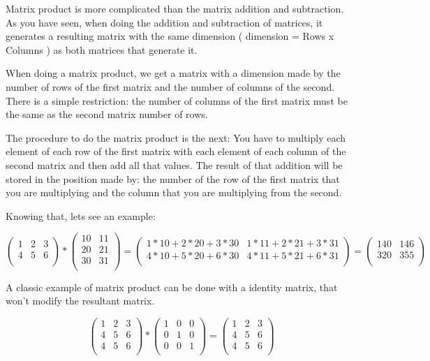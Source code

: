 \documentclass{article}
\begin{document}
Matrix product is more complicated than the matrix addition and subtraction. As you have
seen, when doing the addition and subtraction of matrices, it generates a resulting matrix
with the same dimension ( dimension = Rows x Columns ) as both matrices that generate it.

When doing a matrix product, we get a matrix with a dimension made by the number of rows of
the first matrix and the number of columns of the second. There is a simple restriction: 
the number of columns of the first matrix must be the same as the second matrix number of rows.

The procedure to do the matrix product is the next: You have to multiply each element of 
each row of the first matrix with each element of each column of the second matrix and then
add all that values. The result of that addition will be stored in the position made by: 
the number of the row of the first matrix that you are multiplying and the column that you
are multiplying from the second.

Knowing that, lets see an example:

\[
\begin{pmatrix}
    1 & 2 & 3 \\
    4 & 5 & 6 \\
\end{pmatrix}
  * 
\begin{pmatrix}
    10 & 11 \\
    20 & 21 \\
    30 & 31 \\
\end{pmatrix}
=
\begin{pmatrix}
    1*10+2*20+3*30 & 1*11+2*21+3*31 \\
    4*10+5*20+6*30 & 4*11+5*21+6*31 \\
\end{pmatrix}
=
\begin{pmatrix}
    140 & 146 \\
    320 & 355 \\
\end{pmatrix}
\]

A classic example of matrix product can be done with a identity matrix, that won't modify
the resultant matrix.

\[
\begin{pmatrix}
    1 & 2 & 3 \\
    4 & 5 & 6 \\
    4 & 5 & 6 \\
\end{pmatrix}
  * 
\begin{pmatrix}
    1 & 0 & 0 \\
    0 & 1 & 0 \\
    0 & 0 & 1 \\
\end{pmatrix}
=
\begin{pmatrix}
    1 & 2 & 3 \\
    4 & 5 & 6 \\
    4 & 5 & 6 \\
\end{pmatrix}
\]
\end{document}
